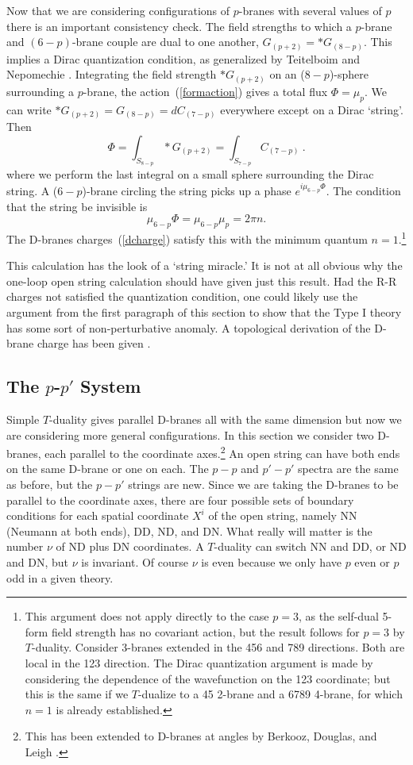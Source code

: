 \documentclass[12pt]{article}
\def\be{\begin{equation}}
\def\ee{\end{equation}}
\begin{document}
Now that we are considering configurations of $p$-branes with several values
of $p$ there is an important consistency check.  The field strengths to
which a $p$-brane and $(6 - p)$-brane couple are dual to one another,
$G_{(p+2)} = *G_{(8-p)}$.  This implies a Dirac quantization condition, as
generalized by Teitelboim and Nepomechie \cite{dirac}.  Integrating the field
strength $*G_{(p+2)}$ on an ($8 - p$)-sphere surrounding a $p$-brane,
the action~(\ref{formaction}) gives a total flux $\Phi=
\mu_p$.  We can write
$*G_{(p+2)} = G_{(8-p)} = d C_{(7-p)}$ everywhere except on a Dirac
`string'.  Then
\be
\Phi= \int_{S_{8-p}} *G_{(p+2)}=\int_{S_{7-p}} C_{(7-p)}\ .
\ee
where we perform the last integral on a small sphere surrounding the Dirac 
string.  A ($6 - p$)-brane circling the string picks up a phase
$e^{i \mu_{6 - p}\Phi}$.  The condition that the string be invisible is
\be
\mu_{6 - p} \Phi = \mu_{6 - p} \mu_p = 2\pi n.
\ee
The D-branes charges~(\ref{dcharge}) satisfy this with the minimum
quantum $n=1$.\footnote
{This argument does not apply directly to the case $p=3$, as the self-dual
5-form field strength has no covariant action, but the result follows for
$p = 3$ by $T$-duality.  Consider 3-branes extended in the 456 and 789
directions.  Both are local in the 123 direction.  The Dirac quantization
argument is made by considering the dependence of the wavefunction on the 123
coordinate; but this is the same if we $T$-dualize to a 45 2-brane and a
6789 4-brane, for which $n=1$ is already established.}

This calculation has the look of a `string miracle.'  It is not at all
obvious why the one-loop open string calculation should have given just this
result.  Had the R-R charges not satisfied the quantization condition, one
could likely use the argument from the first paragraph of this section to
show that the Type I theory has some sort of non-perturbative anomaly. 
A topological derivation of the D-brane charge has been given \cite{ghs}.

\subsection{The $p$-$p'$ System}

Simple $T$-duality gives parallel D-branes all with the same dimension but
now we are considering more general configurations.  In this section
we consider two D-branes, each parallel to the coordinate axes.\footnote
{This has been extended to D-branes at angles by Berkooz, Douglas, and
Leigh \cite{bdl}.}
An open string can have both ends on the same D-brane or one on each.  The
$p-p$ and $p'-p'$ spectra are the same as before, but the $p-p'$ strings are
new.  Since we are taking the D-branes to be parallel to the coordinate axes,
there are four possible sets of boundary conditions for each spatial
coordinate
$X^i$ of the open string, namely NN (Neumann at both ends), DD, ND, and DN.
What really will matter is the number $\nu$ of ND plus DN coordinates.  A
$T$-duality can switch NN and DD, or ND and DN, but $\nu$ is invariant.
Of course $\nu$ is even because we only have $p$ even or $p$ odd in a given
theory.
\end{document}

